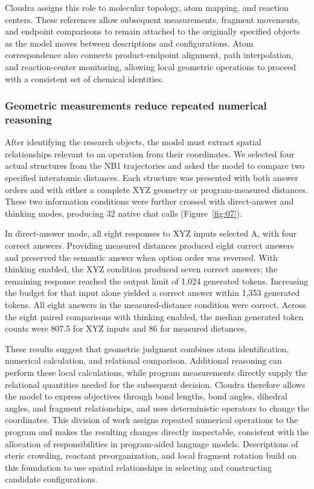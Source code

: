 Cloudra assigns this role to molecular topology, atom mapping, and reaction centers. These references allow subsequent measurements, fragment movements, and endpoint comparisons to remain attached to the originally specified objects as the model moves between descriptions and configurations. Atom correspondence also connects product-endpoint alignment, path interpolation, and reaction-center monitoring, allowing local geometric operations to proceed with a consistent set of chemical identities.



\subsubsection{Geometric measurements reduce repeated numerical reasoning}

After identifying the research objects, the model must extract spatial relationships relevant to an operation from their coordinates. We selected four actual structures from the NB1 trajectories and asked the model to compare two specified interatomic distances. Each structure was presented with both answer orders and with either a complete XYZ geometry or program-measured distances. These two information conditions were further crossed with direct-answer and thinking modes, producing 32 native chat calls (Figure~\ref{fig:07}).

In direct-answer mode, all eight responses to XYZ inputs selected A, with four correct answers. Providing measured distances produced eight correct answers and preserved the semantic answer when option order was reversed. With thinking enabled, the XYZ condition produced seven correct answers; the remaining response reached the output limit of 1,024 generated tokens. Increasing the budget for that input alone yielded a correct answer within 1,353 generated tokens. All eight answers in the measured-distance condition were correct. Across the eight paired comparisons with thinking enabled, the median generated token counts were 807.5 for XYZ inputs and 86 for measured distances.

These results suggest that geometric judgment combines atom identification, numerical calculation, and relational comparison. Additional reasoning can perform these local calculations, while program measurements directly supply the relational quantities needed for the subsequent decision. Cloudra therefore allows the model to express objectives through bond lengths, bond angles, dihedral angles, and fragment relationships, and uses deterministic operators to change the coordinates. This division of work assigns repeated numerical operations to the program and makes the resulting changes directly inspectable, consistent with the allocation of responsibilities in program-aided language models.\citep{ref15} Descriptions of steric crowding, reactant preorganization, and local fragment rotation build on this foundation to use spatial relationships in selecting and constructing candidate configurations.


